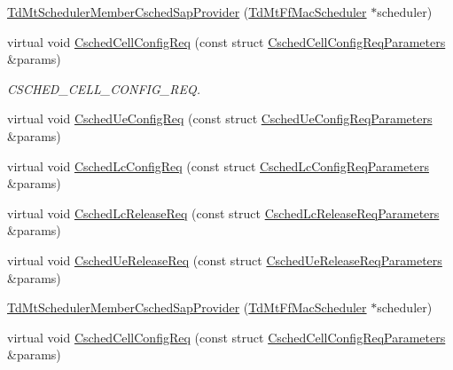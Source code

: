 \begin{DoxyCompactItemize}
\item 
\hyperlink{classns3_1_1TdMtSchedulerMemberCschedSapProvider_a39c8cdd585e3536ce551153e68c58de6}{Td\+Mt\+Scheduler\+Member\+Csched\+Sap\+Provider} (\hyperlink{classns3_1_1TdMtFfMacScheduler}{Td\+Mt\+Ff\+Mac\+Scheduler} $\ast$scheduler)
\item 
virtual void \hyperlink{classns3_1_1TdMtSchedulerMemberCschedSapProvider_a2866955efea719429fca588dbb527be0}{Csched\+Cell\+Config\+Req} (const struct \hyperlink{structns3_1_1FfMacCschedSapProvider_1_1CschedCellConfigReqParameters}{Csched\+Cell\+Config\+Req\+Parameters} \&params)
\begin{DoxyCompactList}\small\item\em C\+S\+C\+H\+E\+D\+\_\+\+C\+E\+L\+L\+\_\+\+C\+O\+N\+F\+I\+G\+\_\+\+R\+EQ. \end{DoxyCompactList}\item 
virtual void \hyperlink{classns3_1_1TdMtSchedulerMemberCschedSapProvider_a4f422807d6e42eb5162d5c9a8d612427}{Csched\+Ue\+Config\+Req} (const struct \hyperlink{structns3_1_1FfMacCschedSapProvider_1_1CschedUeConfigReqParameters}{Csched\+Ue\+Config\+Req\+Parameters} \&params)
\item 
virtual void \hyperlink{classns3_1_1TdMtSchedulerMemberCschedSapProvider_af4b2cf956a35d9cdcfb0a6f6a2138179}{Csched\+Lc\+Config\+Req} (const struct \hyperlink{structns3_1_1FfMacCschedSapProvider_1_1CschedLcConfigReqParameters}{Csched\+Lc\+Config\+Req\+Parameters} \&params)
\item 
virtual void \hyperlink{classns3_1_1TdMtSchedulerMemberCschedSapProvider_a978d07733d7815e8c5d91d467c1a1b49}{Csched\+Lc\+Release\+Req} (const struct \hyperlink{structns3_1_1FfMacCschedSapProvider_1_1CschedLcReleaseReqParameters}{Csched\+Lc\+Release\+Req\+Parameters} \&params)
\item 
virtual void \hyperlink{classns3_1_1TdMtSchedulerMemberCschedSapProvider_a1acd605c886d06fa00ed0a7255536108}{Csched\+Ue\+Release\+Req} (const struct \hyperlink{structns3_1_1FfMacCschedSapProvider_1_1CschedUeReleaseReqParameters}{Csched\+Ue\+Release\+Req\+Parameters} \&params)
\item 
\hyperlink{classns3_1_1TdMtSchedulerMemberCschedSapProvider_a39c8cdd585e3536ce551153e68c58de6}{Td\+Mt\+Scheduler\+Member\+Csched\+Sap\+Provider} (\hyperlink{classns3_1_1TdMtFfMacScheduler}{Td\+Mt\+Ff\+Mac\+Scheduler} $\ast$scheduler)
\item 
virtual void \hyperlink{classns3_1_1TdMtSchedulerMemberCschedSapProvider_a3294f01b92ccb016cd296cf7ef1be6bd}{Csched\+Cell\+Config\+Req} (const struct \hyperlink{structns3_1_1FfMacCschedSapProvider_1_1CschedCellConfigReqParameters}{Csched\+Cell\+Config\+Req\+Parameters} \&params)

\end{DoxyCompactItemize}
